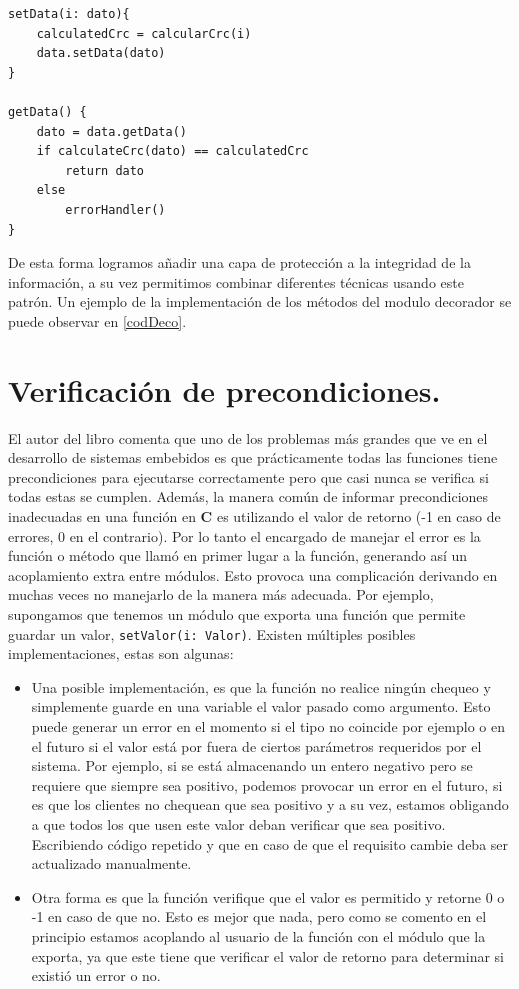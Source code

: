 \begin{lstlisting}[caption=Ejemplo de implementación métodos setData y getData,label={codDeco},style=seudocode]
setData(i: dato){
    calculatedCrc = calcularCrc(i)
    data.setData(dato)
}

getData() {
    dato = data.getData()
    if calculateCrc(dato) == calculatedCrc
        return dato
    else
        errorHandler()
}
\end{lstlisting}

De esta forma logramos añadir una capa de protección a la integridad de la información, a su vez permitimos combinar diferentes técnicas usando este patrón. Un ejemplo de la implementación de los métodos del modulo decorador se puede observar en \ref{codDeco}.

\section{Verificación de precondiciones.}
El autor del libro \cite{douglass} comenta que uno de los problemas más grandes que ve en el desarrollo de sistemas embebidos es que prácticamente todas las funciones tiene precondiciones para ejecutarse correctamente pero que casi nunca se verifica si todas estas se cumplen. Además, la manera común de informar precondiciones inadecuadas en una función en \textbf{C} es utilizando el valor de retorno (-1 en caso de errores, 0 en el contrario). Por lo tanto el encargado de manejar el error es la función o método que llamó en primer lugar a la función, generando así un acoplamiento extra entre módulos. Esto provoca una complicación derivando en muchas veces no manejarlo de la manera más adecuada. Por ejemplo, supongamos que tenemos un módulo que exporta una función que permite guardar un valor, \verb|setValor(i: Valor)|. Existen múltiples posibles implementaciones, estas son algunas:
\begin{itemize}
    \item Una posible implementación, es que la función no realice ningún chequeo y simplemente guarde en una variable el valor pasado como argumento. Esto puede generar un error en el momento si el tipo no coincide por ejemplo o en el futuro si el valor está por fuera de ciertos parámetros requeridos por el sistema. Por ejemplo, si se está almacenando un entero negativo pero se requiere que siempre sea positivo, podemos provocar un error en el futuro, si es que los clientes no chequean que sea positivo y a su vez, estamos obligando a que todos los que usen este valor deban verificar que sea positivo. Escribiendo código repetido y que en caso de que el requisito cambie deba ser actualizado manualmente.
    \item Otra forma es que la función verifique que el valor es permitido y retorne 0 o -1 en caso de que no. Esto es mejor que nada, pero como se comento en el principio estamos acoplando al usuario de la función con el módulo que la exporta, ya que este tiene que verificar el valor de retorno para determinar si existió un error o no.
\end{itemize}

